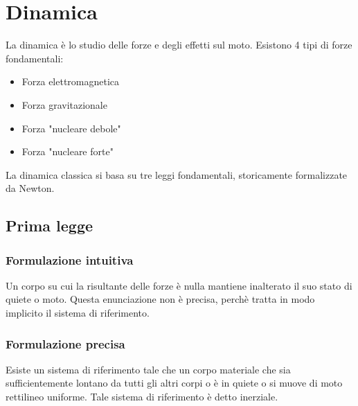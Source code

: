 \documentclass{subfiles}
\begin{document}
\section{Dinamica}

La dinamica è lo studio delle forze e degli effetti sul moto.
Esistono 4 tipi di forze fondamentali:

\begin{itemize}
    \item Forza elettromagnetica
    \item Forza gravitazionale
    \item Forza "nucleare debole"
    \item Forza "nucleare forte"
\end{itemize}

\noindent
La dinamica classica si basa su tre leggi fondamentali, storicamente formalizzate da Newton.

\subsection{Prima legge}

\subsubsection{Formulazione intuitiva}

Un corpo su cui la risultante delle forze è nulla mantiene inalterato il suo stato di quiete o moto.
Questa enunciazione non è precisa, perchè tratta in modo implicito il sistema di riferimento.

\subsubsection{Formulazione precisa}

Esiste un sistema di riferimento tale che un corpo materiale che sia sufficientemente lontano da tutti gli altri corpi o è in quiete o si muove di moto rettilineo uniforme.
Tale sistema di riferimento è detto inerziale.
\end{document}
